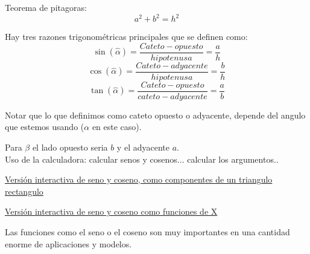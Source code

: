 \documentclass[a4paper,11pt,spanish,sans]{exam}
\begin{document}
\begin{minipage}{0.45\linewidth}


\end{minipage}
\begin{minipage}{0.5\linewidth}
Teorema de pitagoras:
\[
a^2+b^2=h^2
\]

Hay tres razones trigonométricas principales que se definen como: %
\[
\sin(\hat{\alpha})=\frac{Cateto- opuesto}{hipotenusa}= \frac{a}{h}\]
\[
\cos(\hat{\alpha})=\frac{Cateto- adyacente}{hipotenusa}=\frac{b}{h}
\]
\[
\tan(\hat{\alpha})=\frac{Cateto- opuesto}{cateto- adyacente}=\frac{a}{b}
\]
\end{minipage}


Notar que lo que definimos como cateto opuesto o adyacente, depende del angulo que estemos usando ($\alpha$ en este caso).

Para $\beta$ el lado opuesto seria $b$ y el adyacente $a$.\\

Uso de la calculadora:
calcular senos y cosenos...
calcular los argumentos..

\href{http://tube.geogebra.org/m/960}{Versión interactiva de seno y coseno, como componentes de un triangulo rectangulo}

\href{}{Versión interactiva de seno y coseno como funciones de X}%

Las funciones como el seno o el coseno son muy importantes en una cantidad enorme de aplicaciones y modelos.
\end{document}

